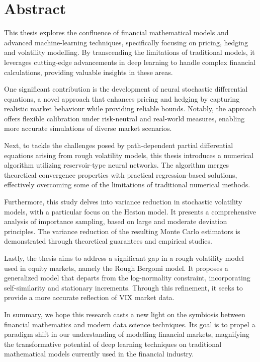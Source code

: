 \abstracttitleandname
\vspace*{-4\baselineskip}
\chapter*{Abstract}
\vspace*{-3\baselineskip}
\begin{spacing}{1.116}
{\small
This thesis explores the confluence of financial mathematical models and advanced machine\nobreakdash-learning techniques, specifically focusing on pricing, hedging and volatility modelling. By transcending the limitations of traditional models, it leverages cutting-edge advancements in deep learning to handle complex financial calculations, providing valuable insights in these areas.

One significant contribution is the development of neural stochastic differential equations, a novel approach that enhances pricing and hedging by capturing realistic market behaviour while providing reliable bounds. Notably, the approach offers flexible calibration under risk-neutral and real-world measures, enabling more accurate simulations of diverse market scenarios.

Next, to tackle the challenges posed by path-dependent partial differential equations arising from rough volatility models, this thesis introduces a numerical algorithm utilizing reservoir-type neural networks. The algorithm merges theoretical convergence properties with practical regression-based solutions, effectively overcoming some of the limitations of traditional numerical methods.

Furthermore, this study delves into variance reduction in stochastic volatility models, with a particular focus on the Heston model. It presents a comprehensive analysis of importance sampling, based on large and moderate deviation principles. The variance reduction of the resulting Monte Carlo estimators is demonstrated through theoretical guarantees and empirical studies.

Lastly, the thesis aims to address a significant gap in a rough volatility model used in equity markets, namely the Rough Bergomi model. It proposes a generalized model that departs from the log-normality constraint, incorporating self-similarity and stationary increments. Through this refinement, it seeks to provide a more accurate reflection of VIX market data.

In summary, we hope this research casts a new light on the symbiosis between financial mathematics and modern data science techniques. Its goal is to propel a paradigm shift in our understanding of modelling financial markets, magnifying the transformative potential of deep learning techniques on traditional mathematical models currently used in the financial industry.
}
\enlargethispage{2\baselineskip}
\end{spacing}



